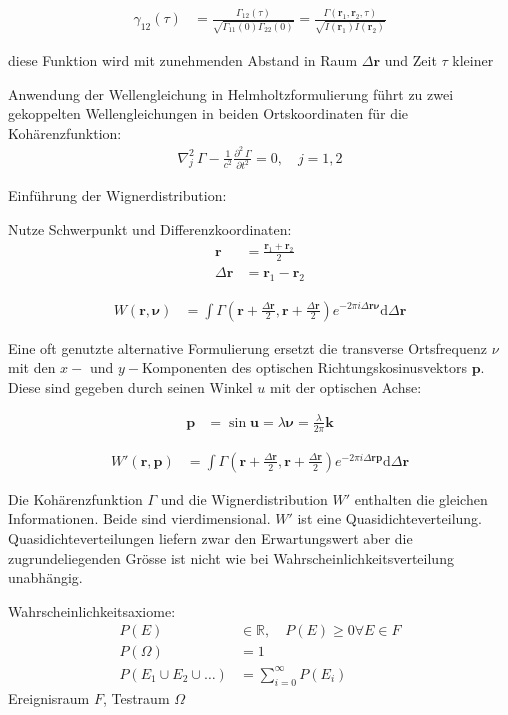 \documentclass{article}
\newcommand{\vect}[1]{\mathbf{#1}}
\renewcommand{\r}{\vect r}
\newcommand{\p}{\vect p}
\renewcommand{\k}{\vect k}
\newcommand{\vnu}{\boldsymbol\nu}
\begin{document}
\begin{align}
  \gamma_{12}(\tau) &= \frac{\Gamma_{12}(\tau)}{\sqrt{\Gamma_{11}(0)\Gamma_{22}(0)}} = \frac{\Gamma(\r_1,\r_2,\tau)}{\sqrt{I(\r_1)I(\r_2)}}
\end{align}

diese Funktion wird mit zunehmenden Abstand in Raum $\Delta\r$ und Zeit $\tau$ kleiner

Anwendung der Wellengleichung in Helmholtzformulierung f\"uhrt zu zwei
gekoppelten Wellengleichungen in beiden Ortskoordinaten f\"ur die
Koh\"arenzfunktion:
\begin{align}
  \nabla_j^2\,\Gamma - \frac{1}{c^2} \frac{\partial^2\, \Gamma}{\partial t^2} = 0, \quad j=1,2
\end{align}

Einf\"uhrung der Wignerdistribution:

Nutze Schwerpunkt und Differenzkoordinaten:
\begin{align}
  \r &= \frac{\r_1+\r_2}{2} \\
  \Delta\r &= \r_1-\r_2
\end{align}


\begin{align}
  W(\r,\vnu) &= \int\Gamma\left(\r+\frac{\Delta\r}{2},\r+\frac{\Delta\r}{2}\right) e^{-2\pi i \Delta\r\vnu}\textrm{d}\Delta\r
\end{align}

Eine oft genutzte alternative Formulierung ersetzt die transverse
Ortsfrequenz $\nu$ mit den $x-$ und $y-$Komponenten des optischen
Richtungskosinusvektors $\p$. Diese sind gegeben durch seinen Winkel
$u$ mit der optischen Achse:

\begin{align}
  \p &= \sin\vect u = \lambda \vnu = \frac{\lambda}{2\pi} \k
\end{align}

\begin{align}
  W'(\r,\p) &= \int\Gamma\left(\r+\frac{\Delta\r}{2},\r+\frac{\Delta\r}{2}\right) e^{-2\pi i \Delta\r\p}\textrm{d}\Delta\r
\end{align}


Die Koh\"arenzfunktion $\Gamma$ und die Wignerdistribution $W'$
enthalten die gleichen Informationen. Beide sind vierdimensional. $W'$
ist eine Quasidichteverteilung. Quasidichteverteilungen liefern zwar
den Erwartungswert aber die zugrundeliegenden Gr\"osse ist nicht wie
bei Wahrscheinlichkeitsverteilung unabh\"angig.

Wahrscheinlichkeitsaxiome:
\begin{align}
  P(E)&\in\mathbb{R},\quad P(E)\ge 0 \forall E \in F\\
  P(\Omega) &= 1\\
  P(E_1\cup E_2\cup\ldots) &= \sum_{i=0}^\infty P(E_i)
\end{align}
Ereignisraum $F$, Testraum $\Omega$
\end{document}
